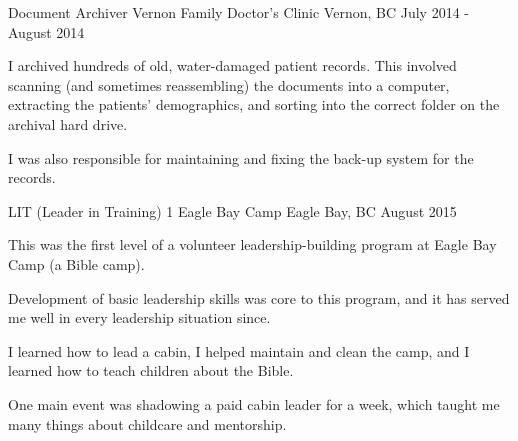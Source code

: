 

\begin{cventries}

  \cventry
    {Document Archiver} %
    {Vernon Family Doctor's Clinic} %
    {Vernon, BC} %
    {July 2014 - August 2014} %
    {
      \begin{cvitems} %
        \item {I archived hundreds of old, water-damaged patient records. This involved scanning (and sometimes reassembling) the documents into a computer, extracting the patients' demographics, and sorting into the correct folder on the archival hard drive.}
        \item {I was also responsible for maintaining and fixing the back-up system for the records.}
      \end{cvitems}
    }

  \cventry
    {LIT (Leader in Training) 1} %
    {Eagle Bay Camp} %
    {Eagle Bay, BC} %
    {August 2015} %
    {
      \begin{cvitems} %
        \item{This was the first level of a volunteer leadership-building program at Eagle Bay Camp (a Bible camp).}
        \item{Development of basic leadership skills was core to this program, and it has served me well in every leadership situation since.}
        \item{I learned how to lead a cabin, I helped maintain and clean the camp, and I learned how to teach children about the Bible.}
        \item{One main event was shadowing a paid cabin leader for a week, which taught me many things about childcare and mentorship.}
      \end{cvitems}
    }


\end{cventries}
